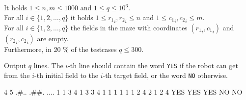 \bigskip
\noindent
It holds $1 \leq n, m \leq 1000$ and $1 \leq q \leq 10^6$.\\
For all $i \in \{ 1, 2, \ldots, q \}$ it holds $1 \leq {r_1}_i, {r_2}_i \leq n$
  and $1 \leq {c_1}_i, {c_2}_i \leq m$.\\
For all $i \in \{ 1, 2, \ldots, q \}$ the fields in the maze with coordinates
  $({r_1}_i, {c_1}_i)$ and $({r_2}_i, {c_2}_i)$ are empty.\\
Furthermore, in 20 \% of the testcases $q \leq 300$.


Output $q$ lines. The $i$-th line should contain the word \texttt{YES} if the
robot can get from the $i$-th initial field to the $i$-th target field, or the
word \texttt{NO} otherwise.


 4 5
.\#..
.\#\#.
....
1 1 3 4
1 3 3 4
1 1 1 1
1 1 2 4
2 1 2 4
\sampleOUT
YES
YES
YES
NO
NO
\sampleEND


